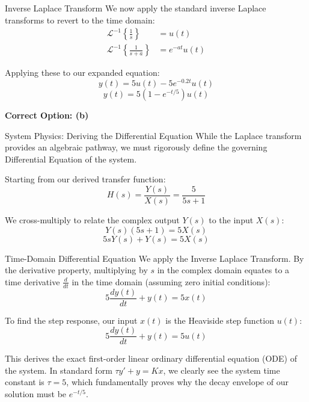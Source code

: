 \documentclass{beamer}
\begin{document}
\begin{frame}{Inverse Laplace Transform}
    We now apply the standard inverse Laplace transforms to revert to the time domain:
    \begin{align}
        \mathcal{L}^{-1} \left\{ \frac{1}{s} \right\} &= u(t) \\
        \mathcal{L}^{-1} \left\{ \frac{1}{s + a} \right\} &= e^{-at}u(t)
    \end{align}
    
    Applying these to our expanded equation:
    \begin{equation}
        y(t) = 5u(t) - 5e^{-0.2t}u(t)
    \end{equation}
    \begin{equation}
        y(t) = 5(1 - e^{-t/5})u(t)
    \end{equation}
    
    \vspace{0.5cm}
    \textbf{Correct Option: (b)}
\end{frame}

\begin{frame}{System Physics: Deriving the Differential Equation}
    While the Laplace transform provides an algebraic pathway, we must rigorously define the governing Differential Equation of the system.
    
    Starting from our derived transfer function:
    \begin{equation}
        H(s) = \frac{Y(s)}{X(s)} = \frac{5}{5s + 1}
    \end{equation}
    
    We cross-multiply to relate the complex output $Y(s)$ to the input $X(s)$:
    \begin{equation}
        Y(s)(5s + 1) = 5X(s)
    \end{equation}
    \begin{equation}
        5sY(s) + Y(s) = 5X(s)
    \end{equation}
\end{frame}

\begin{frame}{Time-Domain Differential Equation}
    We apply the Inverse Laplace Transform. By the derivative property, multiplying by $s$ in the complex domain equates to a time derivative $\frac{d}{dt}$ in the time domain (assuming zero initial conditions):
    \begin{equation}
        5 \frac{dy(t)}{dt} + y(t) = 5x(t)
    \end{equation}
    
    To find the step response, our input $x(t)$ is the Heaviside step function $u(t)$:
    \begin{equation}
        5 \frac{dy(t)}{dt} + y(t) = 5u(t)
    \end{equation}
    
    This derives the exact first-order linear ordinary differential equation (ODE) of the system. In standard form $\tau y' + y = Kx$, we clearly see the system time constant is $\tau = 5$, which fundamentally proves why the decay envelope of our solution must be $e^{-t/5}$.
\end{frame}
\end{document}
